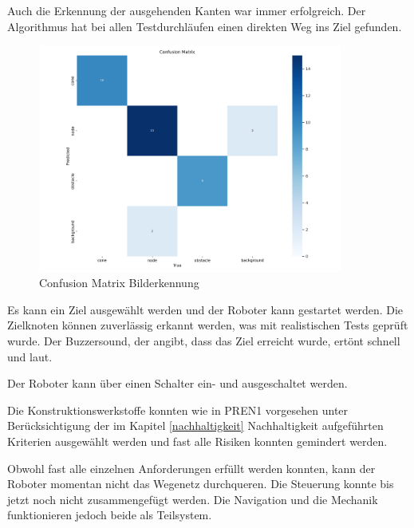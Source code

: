 Auch die Erkennung der ausgehenden Kanten war immer erfolgreich. Der Algorithmus hat bei allen Testdurchläufen einen direkten Weg ins Ziel gefunden. 

\begin{figure}[H]
\centering
\includegraphics[width=10cm]{assets/IT/yolo/confusion_matrix.png}
\caption{Confusion Matrix Bilderkennung}
\label{fig:conf-matrix-model}
\end{figure}

Es kann ein Ziel ausgewählt werden und der Roboter kann gestartet werden. Die Zielknoten können zuverlässig erkannt werden, was mit realistischen Tests geprüft wurde. Der Buzzersound, der angibt, dass das Ziel erreicht wurde, ertönt schnell und laut.

Der Roboter kann über einen Schalter ein- und ausgeschaltet werden.

Die Konstruktionswerkstoffe konnten wie in PREN1 vorgesehen unter Berücksichtigung der im Kapitel \ref{nachhaltigkeit} Nachhaltigkeit aufgeführten Kriterien ausgewählt werden und fast alle Risiken konnten gemindert werden.

Obwohl fast alle einzelnen Anforderungen erfüllt werden konnten, kann der Roboter momentan nicht das Wegenetz durchqueren. Die Steuerung konnte bis jetzt noch nicht zusammengefügt werden. Die Navigation und die Mechanik funktionieren jedoch beide als Teilsystem.